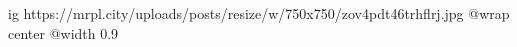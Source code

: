  
 
 
 
 

\ifcmt
  ig https://mrpl.city/uploads/posts/resize/w/750x750/zov4pdt46trhflrj.jpg
  @wrap center
  @width 0.9
\fi
